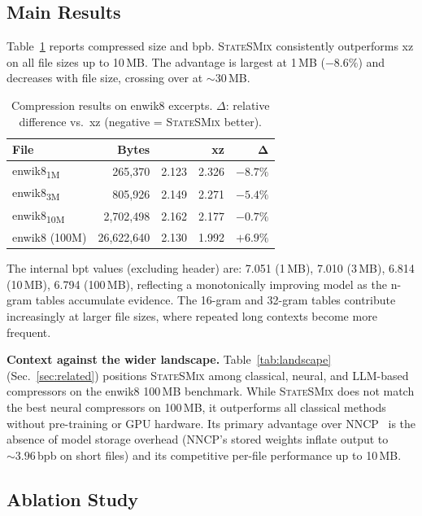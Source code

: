 \documentclass[10pt,twocolumn]{article}
\newcommand{\ssmcomp}{\textsc{StateSMix}}
\newcommand{\bpb}{\text{bpb}}
\begin{document}
\subsection{Main Results}

Table~\ref{tab:main} reports compressed size and bpb.
\ssmcomp{} consistently outperforms xz on all file sizes up to 10\,MB.
The advantage is largest at 1\,MB ($-8.6\%$) and decreases with file
size, crossing over at ${\sim}30$\,MB.

\begin{table}[h]
\centering
\small
\caption{Compression results on enwik8 excerpts.
  $\Delta$: relative difference vs.\ xz
  (negative = \ssmcomp{} better).}
\label{tab:main}
\begin{tabular}{@{}lrrrr@{}}
\toprule
\textbf{File} & \textbf{Bytes} & \textbf{\bpb} & \textbf{xz} & $\boldsymbol{\Delta}$ \\
\midrule
enwik8\textsubscript{1M}  & 265,370  & 2.123 & 2.326 & $-8.7\%$ \\
enwik8\textsubscript{3M}  & 805,926  & 2.149 & 2.271 & $-5.4\%$ \\
enwik8\textsubscript{10M} & 2,702,498 & 2.162 & 2.177 & $-0.7\%$ \\
enwik8 (100M)             & 26,622,640 & 2.130 & 1.992 & $+6.9\%$ \\
\bottomrule
\end{tabular}
\end{table}

The internal bpt values (excluding header) are:
7.051 (1\,MB), 7.010 (3\,MB), 6.814 (10\,MB), 6.794 (100\,MB),
reflecting a monotonically improving model as the n-gram tables
accumulate evidence.  The 16-gram and 32-gram tables contribute
increasingly at larger file sizes, where repeated long contexts
become more frequent.

\textbf{Context against the wider landscape.}
Table~\ref{tab:landscape} (Sec.~\ref{sec:related}) positions \ssmcomp{}
among classical, neural, and LLM-based compressors on the enwik8 100\,MB
benchmark.  While \ssmcomp{} does not match the best neural compressors
on 100\,MB, it outperforms all classical methods without pre-training
or GPU hardware.  Its primary advantage over NNCP~\citep{bellard2021} is
the absence of model storage overhead (NNCP's stored weights inflate output
to ${\sim}3.96$\,bpb on short files) and its competitive per-file
performance up to 10\,MB.

\subsection{Ablation Study}
\label{sec:ablation}
\end{document}
